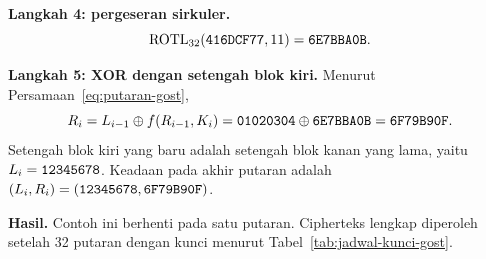 \begin{example}
\textbf{Langkah 4: pergeseran sirkuler.}
\[
\mathrm{ROTL}_{32}(\texttt{416DCF77}, 11) = \texttt{6E7BBA0B}.
\]

\textbf{Langkah 5: XOR dengan setengah blok kiri.} Menurut
Persamaan~\eqref{eq:putaran-gost},
\[
R_i = L_{i-1} \oplus f(R_{i-1}, K_i) = \texttt{01020304} \oplus \texttt{6E7BBA0B} = \texttt{6F79B90F}.
\]
Setengah blok kiri yang baru adalah setengah blok kanan yang lama, yaitu
$L_i = \texttt{12345678}$. Keadaan pada akhir putaran adalah
$(L_i, R_i) = (\texttt{12345678}, \texttt{6F79B90F})$.

\textbf{Hasil.} Contoh ini berhenti pada satu putaran. Cipherteks lengkap
diperoleh setelah 32 putaran dengan kunci menurut
Tabel~\ref{tab:jadwal-kunci-gost}.
\end{example}

